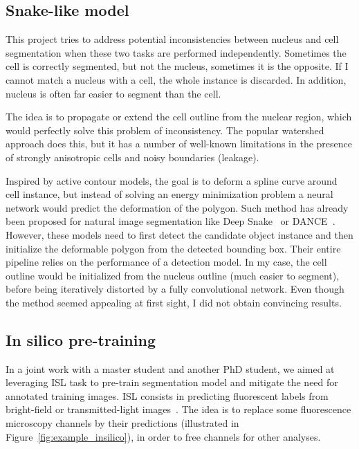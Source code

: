 \subsection{Snake-like model}
\label{subsec:segmentation_snake}

This project tries to address potential inconsistencies between nucleus and cell segmentation when these two tasks are performed independently.
Sometimes the cell is correctly segmented, but not the nucleus, sometimes it is the opposite.
If I cannot match a nucleus with a cell, the whole instance is discarded.
In addition, nucleus is often far easier to segment than the cell.

The idea is to propagate or extend the cell outline from the nuclear region, which would perfectly solve this problem of inconsistency.
The popular watershed approach does this, but it has a number of well-known limitations in the presence of strongly anisotropic cells and noisy boundaries (leakage).

Inspired by active contour models, the goal is to deform a spline curve around cell instance, but instead of solving an energy minimization problem a neural network would predict the deformation of the polygon.
Such method has already been proposed for natural image segmentation like Deep Snake~\cite{Peng_2020_CVPR} or DANCE~\cite{Liu_2021}.
However, these models need to first detect the candidate object instance and then initialize the deformable polygon from the detected bounding box.
Their entire pipeline relies on the performance of a detection model.
In my case, the cell outline would be initialized from the nucleus outline (much easier to segment), before being iteratively distorted by a fully convolutional network.
Even though the method seemed appealing at first sight, I did not obtain convincing results.

\subsection{In silico pre-training}
\label{subsec:segmentation_insilico}

In a joint work with a master student and another PhD student, we aimed at leveraging \ac{ISL} task to pre-train segmentation model and mitigate the need for annotated training images.
\ac{ISL} consists in predicting fluorescent labels from bright-field or transmitted-light images~\cite{christiansen_silico_2018, ounkomol_label_free_2018}.
The idea is to replace some fluorescence microscopy channels by their predictions (illustrated in Figure~\ref{fig:example_insilico}), in order to free channels for other analyses.

